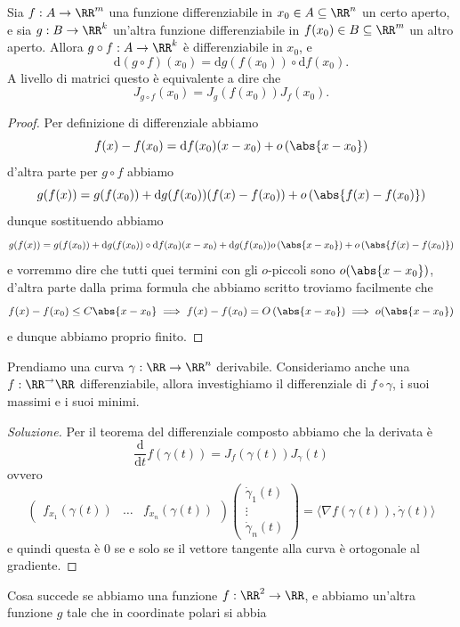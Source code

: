 \documentclass[11pt]{scrartcl}
\newcommand{\dif}{\text{d}}
\begin{document}
	\begin{theorem}
		Sia $f:A\to\RR^m$ una funzione differenziabile in $x_0\in A\subseteq \RR^n$ un certo aperto, e sia $g:B\to\RR^k$ un'altra funzione differenziabile in $f(x_0)\in B\subseteq \RR^m$ un altro aperto. Allora $g\circ f:A\to \RR^k$ è differenziabile in $x_0$, e
		$$\dif \left(g\circ f\right)(x_0)=\dif g \left(f(x_0)\right)\circ \dif f(x_0).$$
		A livello di matrici questo è equivalente a dire che
		$$J_{g\circ f}(x_0)=J_g(f(x_0))J_f(x_0).$$ 
	\end{theorem}
	\begin{proof}
		Per definizione di differenziale abbiamo
		$$f(x)-f(x_0)=\dif f(x_0)(x-x_0)+o\left(\abs{x-x_0}\right)$$
		d'altra parte per $g\circ f$ abbiamo
		$$g(f(x))=g(f(x_0))+\dif g (f(x_0))(f(x)-f(x_0))+o\left(\abs{f(x)-f(x_0)}\right)$$
		dunque sostituendo abbiamo
		$$g(f(x))=g(f(x_0))+\dif g (f(x_0))\circ\dif f(x_0)(x-x_0)+\dif g (f(x_0))o\left(\abs{x-x_0}\right)+o\left(\abs{f(x)-f(x_0)}\right)$$
		e vorremmo dire che tutti quei termini con gli $o$-piccoli sono $o(\abs{x-x_0})$, d'altra parte dalla prima formula che abbiamo scritto troviamo facilmente che 
		$$f(x)-f(x_0)\le C\abs{x-x_0} \implies f(x)-f(x_0)=O\left(\abs{x-x_0}\right) \implies o(\abs{x-x_0})$$
		e dunque abbiamo proprio finito.
	\end{proof}
	\begin{exercise}
		Prendiamo una curva $\gamma:\RR\to\RR^n$ derivabile. Consideriamo anche una $f:\RR^\to\RR$ differenziabile, allora investighiamo il differenziale di $f\circ \gamma$, i suoi massimi e i suoi minimi.
	\end{exercise}
	\begin{proof}[Soluzione]
		Per il teorema del differenziale composto abbiamo che la derivata è
		$$\frac{\dif}{\dif t}f(\gamma(t))=J_f(\gamma(t))J_\gamma(t)$$
		ovvero
		$$\begin{pmatrix}
			f_{x_1}(\gamma(t)) & \dots & f_{x_n}(\gamma(t)) 
		\end{pmatrix}
		\begin{pmatrix}
			\dot{\gamma}_1(t) \\
			\vdots \\
			\dot{\gamma}_n(t)
		\end{pmatrix}=\langle \nabla f(\gamma(t)),\dot{\gamma}(t)\rangle
		$$
		e quindi questa è $0$ se e solo se il vettore tangente alla curva è ortogonale al gradiente.
	\end{proof}
	Cosa succede se abbiamo una funzione $f:\RR^2\to\RR$, e abbiamo un'altra funzione $g$ tale che in coordinate polari si abbia
\end{document}
